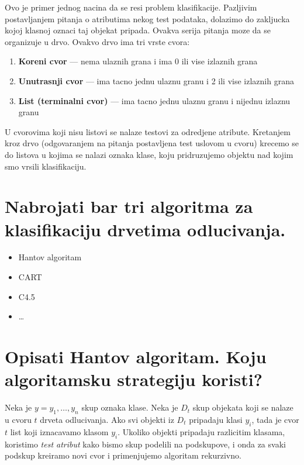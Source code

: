 \documentclass[a4paper]{article}
\begin{document}
Ovo je primer jednog nacina da se resi problem klasifikacije. Pazljivim postavljanjem pitanja o
atributima nekog test podataka, dolazimo do zakljucka kojoj klasnoj oznaci taj objekat pripada.
Ovakva serija pitanja moze da se organizuje u drvo. Ovakvo drvo ima tri vrste cvora:
\begin{enumerate}
    \item \textbf{Koreni cvor} --- nema ulaznih grana i ima 0 ili vise izlaznih grana
    \item \textbf{Unutrasnji cvor} --- ima tacno jednu ulaznu granu i 2 ili vise izlaznih grana
    \item \textbf{List (terminalni cvor)} --- ima tacno jednu ulaznu granu i nijednu izlaznu granu
\end{enumerate}

U cvorovima koji nisu listovi se nalaze testovi za odredjene atribute. Kretanjem kroz drvo
(odgovaranjem na pitanja postavljena test uslovom u cvoru) krecemo se do listova u kojima se nalazi
oznaka klase, koju pridruzujemo objektu nad kojim smo vrsili klasifikaciju.

\section{Nabrojati bar tri algoritma za klasifikaciju drvetima odlucivanja.}
\begin{itemize}
    \item Hantov algoritam
    \item CART
    \item C4.5
    \item \ldots
\end{itemize}

\section{Opisati Hantov algoritam. Koju algoritamsku strategiju koristi?}
Neka je \(y = {y_1,\ldots,y_n}\) skup oznaka klase. Neka je \(D_t\) skup objekata koji se nalaze u
cvoru \(t\) drveta odlucivanja. Ako svi objekti iz \(D_t\) pripadaju klasi \(y_i\), tada je cvor
\(t\) list koji iznacavamo klasom \(y_i\). Ukoliko objekti pripadaju razlicitim klasama, koristimo
\emph{test atribut} kako bismo skup podelili na podskupove, i onda za svaki podskup kreiramo novi
cvor i primenjujemo algoritam rekurzivno.
\end{document}
